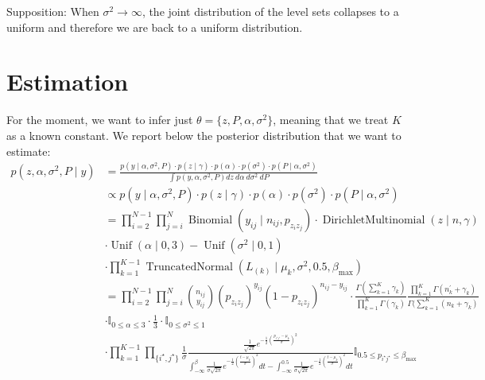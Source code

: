 \documentclass[11pt]{amsart}
\begin{document}
Supposition:
When $\sigma^2 \rightarrow \infty$, the joint distribution of the level sets collapses to a uniform and therefore we are back to a uniform distribution.










\clearpage

\section{Estimation}

For the moment, we want to infer just $\theta = \{ z, P, \alpha, \sigma^2 \}$, meaning that we treat $K$ as a known constant. We report below the posterior distribution that we want to estimate:
\begin{align}\label{eqn:general_posterior}
p(z,\alpha,\sigma^2,P\mid y) &= \frac{p( y \mid \alpha,\sigma^2,P) \cdot p(z \mid \gamma) \cdot p(\alpha)  \cdot p(\sigma^2) \cdot p(P \mid \alpha, \sigma^2) }{\int p( y, \alpha,\sigma^2,P) dz \ d\alpha \ d\sigma^2 \ dP} \nonumber \\
&\propto p( y \mid \alpha,\sigma^2,P)  \cdot p(z \mid \gamma) \cdot p(\alpha)  \cdot p(\sigma^2) \cdot p(P \mid \alpha, \sigma^2) \nonumber\\
&= \prod_{i =2 }^{N-1} \prod_{j =i}^{N} \operatorname{Binomial}\left(y_{ij} \mid n_{ij}, p_{z_i z_j} \right)  \cdot \operatorname{DirichletMultinomial} \left(z \mid n,\gamma \right) \nonumber\\
&\cdot \operatorname{Unif}\left(\alpha \mid 0, 3\right) - \operatorname{Unif} \left( \sigma^{2} \mid 0, 1\right) \nonumber \\
&\cdot \prod_{k=1}^{K-1} \operatorname{TruncatedNormal}\left( L_{(k)} \mid \mu_k, \sigma^{2}, 0.5, \beta_{\max} \right) \nonumber \\
&= \prod_{i =2 }^{N-1} \prod_{j =i}^{N} \binom{n_{ij}}{y_{ij}} (p_{z_i z_j})^{y_{ij}}(1 - p_{z_i z_j})^{n_{ij} - y_{ij}} \cdot \frac{\Gamma(\sum_{k=1}^K \gamma_k)}{\prod_{k=1}^K \Gamma(\gamma_k)}\frac{\prod_{k=1}^K \Gamma(n^{\prime}_k+\gamma_k)}{\Gamma(\sum_{k=1}^K (n_k+\gamma_k)}  \\
&\cdot \mathbb{I}_{0 \leq \alpha \leq 3} \cdot \frac{1}{3} \cdot \mathbb{I}_{0 \leq \sigma^2 \leq 1} \nonumber  \nonumber \\
&\cdot \prod_{k=1}^{K-1} \prod_{\{i^\star, j^\star\}}  \frac{1}{\sigma} \frac{\frac{1}{\sqrt{2\pi}} e^{-\frac{1}{2}\left(\frac{p_{i^\star j^\star} -  \mu_k}{\sigma}\right)^2}}{\int_{-\infty}^\beta \frac{1}{\sigma\sqrt{2\pi}} e^{-\frac{1}{2}\left(\frac{t-  \mu_k}{\sigma}\right)^2 }dt -\int_{-\infty}^{0.5} \frac{1}{\sigma\sqrt{2\pi}} e^{-\frac{1}{2}\left(\frac{t-  \mu_k}{\sigma}\right)^2 }dt}  \mathbb{I}_{0.5 \leq p_{i^\star j^\star} \leq \beta_{\max}}\nonumber
\end{align}
\end{document}
